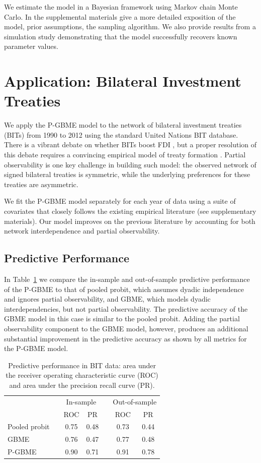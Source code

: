\documentclass[a4paper, 12pt]{article}
\begin{document}
We estimate the model in a Bayesian framework using Markov chain Monte Carlo.  In the supplemental materials give a more detailed exposition of the model, prior assumptions, the sampling algorithm. We also provide results from a simulation study demonstrating that the model successfully recovers known parameter values.

\section{Application: Bilateral Investment Treaties}

We apply the P-GBME model to the network of bilateral investment treaties (BITs) from 1990 to 2012 using the standard United Nations BIT database. There is a vibrant debate on whether BITs boost FDI \citep{jandhyala:etal:2011, simmons:2014,minhas:2016}, but a proper resolution of this debate requires a convincing empirical model of treaty formation \citep{rosendorff:shin:2012}. Partial observability is one key challenge in building such model: the observed network of signed bilateral treaties is symmetric, while the underlying preferences for these treaties are  asymmetric. 

We fit the P-GBME model separately for each year of data using a suite of covariates that closely follows  the existing empirical literature (see supplementary materials). Our model improves on the previous literature by accounting for both network interdependence and partial observability. 

\subsection{Predictive Performance}

In Table~\ref{tab:perfAssess} we compare the in-sample and out-of-sample predictive performance of the P-GBME to that of pooled probit, which assumes dyadic independence and ignores partial observability, and GBME, which models dyadic interdependencies, but not partial observability. The predictive accuracy of the GBME model in this case is similar to the pooled probit. Adding the partial observability component to the GBME model, however, produces an additional substantial improvement in the predictive accuracy as shown by all metrics for the P-GBME model.

\begin{table}[h!]
\centering
\begin{tabular}{lcccccc}
\toprule
& & \multicolumn{2}{c}{In-sample} & & \multicolumn{2}{c}{Out-of-sample} \\
\cmidrule{3-4}\cmidrule{6-7}
& & ROC & PR & & ROC & PR\\
\midrule
Pooled probit& & 0.75 & 0.48 &  & 0.73 & 0.44\\
GBME && 0.76 & 0.47 & & 0.77 & 0.48 \\
P-GBME && 0.90 & 0.71 & & 0.91 & 0.78 \\
\bottomrule
\end{tabular}
\caption{Predictive performance in BIT data: area under the receiver operating characteristic curve (ROC) and area under the precision recall curve (PR).}
\label{tab:perfAssess}
\end{table} 
\end{document}
